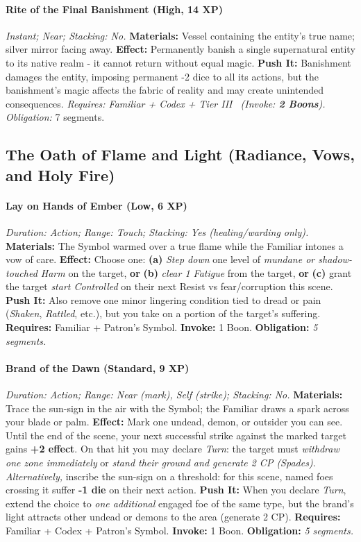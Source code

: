 \documentclass[12pt,twoside]{book}
\begin{document}
\paragraph{Rite of the Final Banishment (High, 14 XP)} \emph{Instant; Near; Stacking: No.}
\textbf{Materials:} Vessel containing the entity's true name; silver mirror facing away.
\textbf{Effect:} Permanently banish a single supernatural entity to its native realm - it cannot return without equal magic.
\textbf{Push It:} Banishment damages the entity, imposing permanent -2 dice to all its actions, but the banishment's magic affects the fabric of reality and may create unintended consequences.
\emph{Requires: Familiar + Codex + Tier III \ (\textit{Invoke:} \textbf{2 Boons}).}
\emph{Obligation:} 7 segments.

\subsection{The Oath of Flame and Light (Radiance, Vows, and Holy Fire)}
\paragraph{Lay on Hands of Ember (Low, 6 XP)} \emph{Duration: Action; Range: Touch; Stacking: Yes (healing/warding only).}  
\textbf{Materials:} The Symbol warmed over a true flame while the Familiar intones a vow of care.  
\textbf{Effect:} Choose one: \textbf{(a)} \emph{Step down} one level of \emph{mundane or shadow-touched Harm} on the target, \textbf{or} \textbf{(b)} \emph{clear 1 Fatigue} from the target, \textbf{or} \textbf{(c)} grant the target \emph{start Controlled} on their next Resist vs fear/corruption this scene.  
\textbf{Push It:} Also remove one minor lingering condition tied to dread or pain (\emph{Shaken}, \emph{Rattled}, etc.), but you take on a portion of the target's suffering.
\textbf{Requires:} Familiar + Patron's Symbol. \;\; \textbf{Invoke:} 1 Boon. \;\; \textbf{Obligation:} \emph{5 segments.}

\paragraph{Brand of the Dawn (Standard, 9 XP)} \emph{Duration: Action; Range: Near (mark), Self (strike); Stacking: No.}  
\textbf{Materials:} Trace the sun-sign in the air with the Symbol; the Familiar draws a spark across your blade or palm.  
\textbf{Effect:} Mark one undead, demon, or outsider you can see. Until the end of the scene, your next successful strike against the marked target gains \textbf{+2 effect}. On that hit you may declare \emph{Turn}: the target must \emph{withdraw one zone immediately} or \emph{stand their ground and generate 2 CP (Spades)}.  
\emph{Alternatively,} inscribe the sun-sign on a threshold: for this scene, named foes crossing it suffer \textbf{-1 die} on their next action.  
\textbf{Push It:} When you declare \emph{Turn}, extend the choice to \emph{one additional} engaged foe of the same type, but the brand's light attracts other undead or demons to the area (generate 2 CP).
\textbf{Requires:} Familiar + Codex + Patron's Symbol. \;\; \textbf{Invoke:} 1 Boon. \;\; \textbf{Obligation:} \emph{5 segments.}
\end{document}

